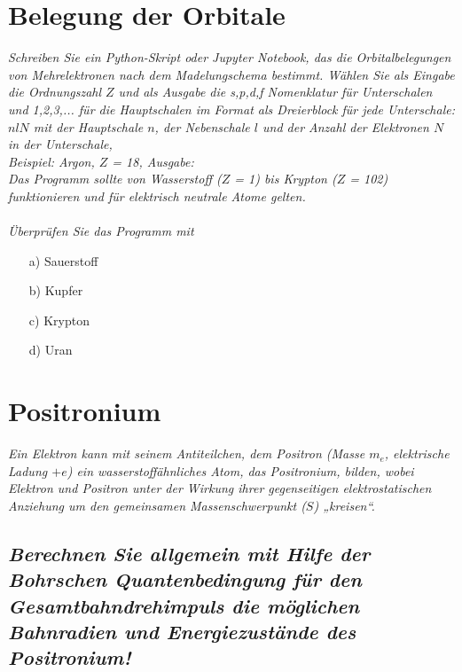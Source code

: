 \documentclass[ex,minted]{exercise_4.0}
\begin{document}
\section{Belegung der Orbitale}
{\it 
Schreiben Sie ein Python-Skript oder Jupyter Notebook, das die Orbitalbelegungen von Mehrelektronen nach dem Madelungschema bestimmt. Wählen Sie als Eingabe die Ordnungszahl $Z$ und als Ausgabe die
s,p,d,f Nomenklatur für Unterschalen und 1,2,3,... für die Hauptschalen im Format als Dreierblock für jede Unterschale: $nlN$ mit der Hauptschale $n$, der Nebenschale $l$ und der Anzahl der Elektronen $N$ in der
Unterschale,\\
Beispiel: Argon, $Z$ = 18, Ausgabe: \\
Das Programm sollte von Wasserstoff ($Z$ = 1) bis Krypton ($Z$ = 102) funktionieren und für elektrisch neutrale Atome gelten.\\\\
Überprüfen Sie das Programm mit 
\begin{enumerate}
    \item[a)] Sauerstoff
    \item[b)] Kupfer
    \item[c)] Krypton
    \item[d)] Uran
\end{enumerate}
}

\dottedlinett


\section{Positronium}
{\it Ein Elektron kann mit seinem Antiteilchen, dem Positron (Masse $m_e$, elektrische Ladung $+e$) ein wasserstoffähnliches Atom, das Positronium, bilden, wobei Elektron und Positron unter der Wirkung ihrer gegenseitigen elektrostatischen Anziehung um den gemeinsamen Massenschwerpunkt ($S$) „kreisen“.}

\subsection{\it Berechnen Sie allgemein mit Hilfe der Bohrschen Quantenbedingung für den Gesamtbahndrehimpuls die
möglichen Bahnradien und Energiezustände des Positronium!}

\dottedlinett
\end{document}
